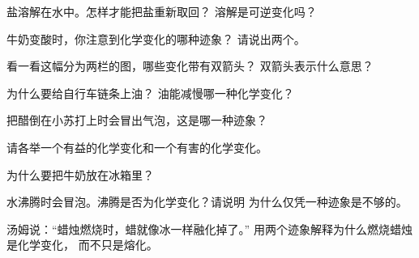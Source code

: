 \begin{exercise}[$\star$]\label{exo:g5:irreversible-changes:3}
盐溶解在水中。怎样才能把盐重新取回？
溶解是可逆变化吗？
\end{exercise}

\begin{exercise}[$\star$]\label{exo:g5:irreversible-changes:4}
牛奶变酸时，你注意到化学变化的哪种迹象？
请说出两个。
\end{exercise}

\begin{exercise}[$\star$]\label{exo:g5:irreversible-changes:5}
看一看这幅分为两栏的图，哪些变化带有双箭头？
双箭头表示什么意思？
\end{exercise}

\begin{exercise}[$\star$]\label{exo:g5:irreversible-changes:6}
为什么要给自行车链条上油？
油能减慢哪一种化学变化？
\end{exercise}

\begin{exercise}[$\star$]\label{exo:g5:irreversible-changes:7}
把醋倒在小苏打上时会冒出气泡，这是哪一种迹象？
\end{exercise}

\begin{exercise}[$\star$]\label{exo:g5:irreversible-changes:8}
请各举一个有益的化学变化和一个有害的化学变化。
\end{exercise}

\begin{exercise}[$\star$]\label{exo:g5:irreversible-changes:9}
为什么要把牛奶放在冰箱里？
\end{exercise}

\begin{exercise}[$\star\star$]\label{exo:g5:irreversible-changes:10}
水沸腾时会冒泡。沸腾是否为化学变化？请说明
为什么仅凭一种迹象是不够的。
\end{exercise}

\begin{exercise}[$\star\star$]\label{exo:g5:irreversible-changes:11}
汤姆说：“蜡烛燃烧时，蜡就像冰一样融化掉了。”
用两个迹象解释为什么燃烧蜡烛是化学变化，
而不只是熔化。
\end{exercise}
